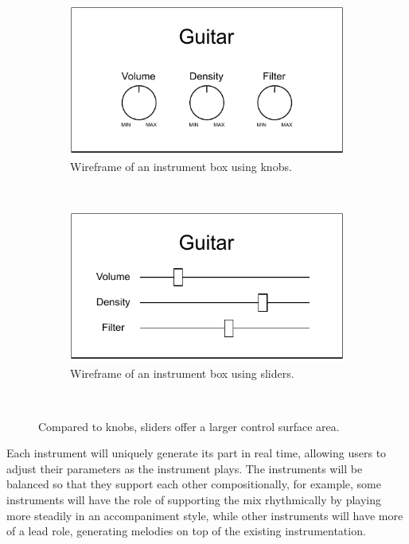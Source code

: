 \begin{figure}[htb] 
    \centering
    \begin{subfigure}[b]{0.45\textwidth}
        \includegraphics[width=\textwidth]{images/design/instrument-knob-wireframe.pdf}
        \caption{Wireframe of an instrument box using knobs.}
        \label{fig:instrument-knob-wireframe}
    \end{subfigure}
    ~
    \begin{subfigure}[b]{0.45\textwidth}
        \includegraphics[width=\textwidth]{images/design/instrument-slider-wireframe.pdf}
        \caption{Wireframe of an instrument box using sliders.}
        \label{fig:instrument-slider-wireframe}
    \end{subfigure}
    ~
    \caption{
    Compared to  knobs,  sliders offer a larger control surface area.
    }\label{fig:instrument-wireframe}
\end{figure}

Each instrument will uniquely generate its part in real time, allowing users to adjust their parameters as the instrument plays. The instruments will be balanced so that they support each other compositionally, for example, some instruments will have the role of supporting the mix rhythmically by playing more steadily in an accompaniment style, while other instruments will have more of a lead role, generating melodies on top of the existing instrumentation.

